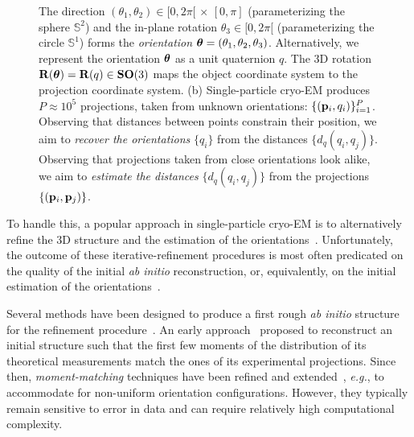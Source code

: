 \begin{figure}
{    The direction $(\theta_1, \theta_2) \in [0,2\pi[ \, \times \, [0,\pi]$ (parameterizing the sphere $\mathbb{S}^2$) and the in-plane rotation $\theta_3 \in [0,2\pi[$ (parameterizing the circle $\mathbb{S}^1$) forms the \textit{orientation} ${\boldsymbol{\theta}} = (\theta_1, \theta_2, \theta_3)$.
    Alternatively, we represent the orientation ${\boldsymbol{\theta}}$ as a unit quaternion $q$.
    The 3D rotation $\mathbf{R}({\boldsymbol{\theta}}) = \mathbf{R}(q) \in \mathrm{\mathbf{SO}}(3)$ maps the object coordinate system to the projection coordinate system.
    (b) Single-particle cryo-EM produces $P \approx 10^5$ projections, taken from unknown orientations: $\{(\mathbf{p}_i, q_i)\}_{i=1}^P$.
    Observing that distances between points constrain their position, we aim to \textit{recover the orientations} $\{q_i\}$ from the distances $\{d_q(q_i, q_j)\}$.
    Observing that projections taken from close orientations look alike, we aim to \textit{estimate the distances} $\{d_q(q_i, q_j)\}$ from the projections $\{(\mathbf{p}_i, \mathbf{p}_j)\}$.
}
\end{figure}

To handle this, a popular approach in single-particle cryo-EM is to alternatively refine the 3D structure and the estimation of the orientations~\cite{penczek1994ribosome,Baker1996,Dempster1977,sigworth1998maximum,scheres2012bayesian,zehni2020joint}. Unfortunately, the outcome of these iterative-refinement procedures is most often predicated on the quality of the initial \textit{ab initio} reconstruction, or, equivalently, on the initial estimation of the orientations~\cite{sorzano2006optimization,henderson2012outcome}.

Several methods have been designed to produce a first rough \textit{ab initio} structure for the refinement procedure~\cite{singer2020computational}. An early approach~\cite{kam1980reconstruction} proposed to reconstruct an initial structure such that the first few moments of the distribution of its theoretical measurements match the ones of its experimental projections. Since then, \textit{moment-matching} techniques have been refined and extended~\cite{salzman1990method,goncharov1988integral,sharon2019method}, \textit{e.g.}, to accommodate for non-uniform orientation configurations. However, they typically remain sensitive to error in data and can require relatively high computational complexity.  %

